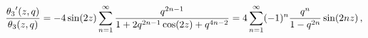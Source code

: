 \[\frac{\mathop{\theta_{3}\/}\nolimits'\!\left(z,q\right)}{\mathop{\theta_{3}\/}%
\nolimits\!\left(z,q\right)}=-4\mathop{\sin\/}\nolimits\!\left(2z\right)\sum_{%
n=1}^{\infty}\frac{q^{2n-1}}{1+2q^{2n-1}\mathop{\cos\/}\nolimits\!\left(2z%
\right)+q^{4n-2}}=4\sum_{n=1}^{\infty}(-1)^{n}\frac{q^{n}}{1-q^{2n}}\mathop{%
\sin\/}\nolimits\!\left(2nz\right),\]